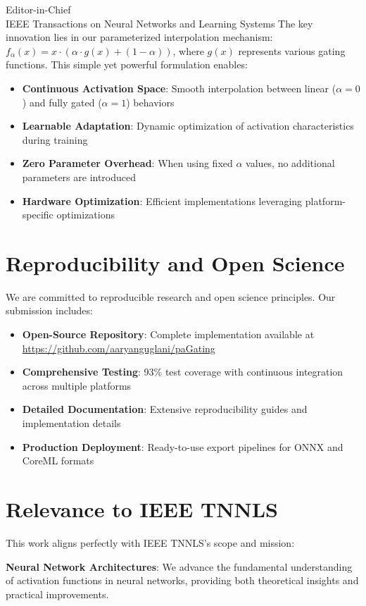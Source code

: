 \documentclass[11pt]{letter}
\begin{document}
\begin{letter}{Editor-in-Chief\\
IEEE Transactions on Neural Networks and Learning Systems}
The key innovation lies in our parameterized interpolation mechanism: $f_{\alpha}(x) = x \cdot (\alpha \cdot g(x) + (1-\alpha))$, where $g(x)$ represents various gating functions. This simple yet powerful formulation enables:

\begin{itemize}
    \item \textbf{Continuous Activation Space}: Smooth interpolation between linear ($\alpha=0$) and fully gated ($\alpha=1$) behaviors
    \item \textbf{Learnable Adaptation}: Dynamic optimization of activation characteristics during training
    \item \textbf{Zero Parameter Overhead}: When using fixed $\alpha$ values, no additional parameters are introduced
    \item \textbf{Hardware Optimization}: Efficient implementations leveraging platform-specific optimizations
\end{itemize}

\section*{Reproducibility and Open Science}

We are committed to reproducible research and open science principles. Our submission includes:

\begin{itemize}
    \item \textbf{Open-Source Repository}: Complete implementation available at \url{https://github.com/aaryanguglani/paGating}
    \item \textbf{Comprehensive Testing}: 93\% test coverage with continuous integration across multiple platforms
    \item \textbf{Detailed Documentation}: Extensive reproducibility guides and implementation details
    \item \textbf{Production Deployment}: Ready-to-use export pipelines for ONNX and CoreML formats
\end{itemize}

\section*{Relevance to IEEE TNNLS}

This work aligns perfectly with IEEE TNNLS's scope and mission:

\textbf{Neural Network Architectures}: We advance the fundamental understanding of activation functions in neural networks, providing both theoretical insights and practical improvements.


\end{letter}
\end{document}
